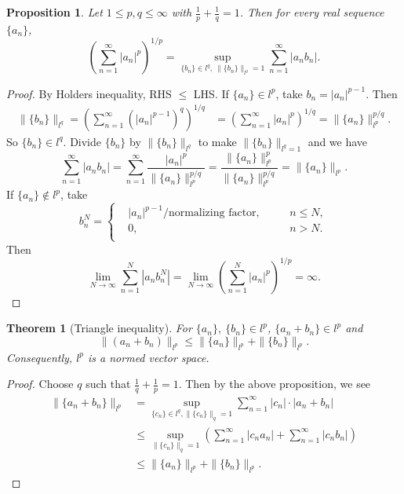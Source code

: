 \documentclass[12pt]{article}
\theoremstyle{plain}
\newtheorem{thm}{Theorem}
\newtheorem*{prop}{Proposition}
\theoremstyle{definition}
\begin{document}
\begin{prop}
    Let $1\leq p, q\leq \infty$ with $\frac{1}{p} + \frac{1}{q} = 1$.
    Then for every real sequence $\{a_n\}$,
    \[\left(\sum_{n=1}^\infty |a_n|^p\right)^{1/p} = \sup_{\{b_n\}\in l^q,\ \|\{b_n\}\|_{l^q} = 1} \sum_{n=1}^\infty
    |a_nb_n|.\]
\end{prop}
\begin{proof}
    By Holders inequality, RHS $\leq$ LHS.
    If $\{a_n\}\in l^p$, take $b_n = |a_n|^{p-1}$.
    Then
    \[\begin{aligned}
            \|\{b_n\}\|_{l^q} = \left(\sum_{n=1}^\infty \left(|a_n|^{p-1}\right)^q\right)^{1/q} &= \left(\sum_{n=1}^\infty
            |a_n|^p\right)^{1/q} = \|\{a_n\}\|_{l^p}^{p/q}.
    \end{aligned}\]
    So $\{b_n\}\in l^q$.
    Divide $\{b_n\}$ by $\|\{b_n\}\|_{l^q}$ to make $\|\{b_n\}\|_{l^q=1}$ and
    we have
    \[
        \sum_{n=1}^\infty |a_nb_n| = \sum_{n=1}^\infty \frac{|a_n|^p}{\|\{a_n\}\|_{l^p}^{p/q}} =
        \frac{\|\{a_n\}\|_{l^p}^p}{\|\{a_n\}\|_{l^p}^{p/q}} = \|\{a_n\}\|_{l^p}.
    \]
    If $\{a_n\}\notin l^p$, take
    \[b_n^N=\left\{
            \begin{aligned}
                &|a_n|^{p-1}/\text{normalizing factor},\quad&& n\leq N,\\
                &0,&&n>N.\\
        \end{aligned}
    \right.\]
    Then
    \[
        \lim_{N\rightarrow\infty}\sum_{n=1}^N |a_nb_n^N| = \lim_{N\rightarrow\infty}\left(\sum_{n=1}^N
        |a_n|^p\right)^{1/p} = \infty.
    \]
\end{proof}

\begin{thm}[Triangle inequality]
    For $\{a_n\},\ \{b_n\}\in l^p$, $\{a_n+b_n\}\in l^p$ and 
    \[
        \|(a_n+b_n)\|_{l^p} \leq \|\{a_n\}\|_{l^p} + \|\{b_n\}\|_{l^p}.
    \]
    Consequently, $l^p$ is a normed vector space.
\end{thm}
\begin{proof}
    Choose $q$ such that $\frac{1}{q} + \frac{1}{p} = 1$.
    Then by the above proposition, we see
    \[
        \begin{aligned}
            \|\{a_n+b_n\}\|_{l^p} 
            &= \sup_{\{c_n\}\in l^q, \|\{c_n\}\|_q=1} \sum_{n=1}^\infty |c_n|\cdot |a_n+b_n|\\
            &\leq \sup_{\|\{c_n\}\|_q = 1} \left(\sum_{n=1}^\infty |c_n a_n| + \sum_{n=1}^\infty |c_nb_n|\right)\\
            &\leq \|\{a_n\}\|_{l^p} + \|\{b_n\}\|_{l^p}.
        \end{aligned}
    \]
\end{proof}
\end{document}
